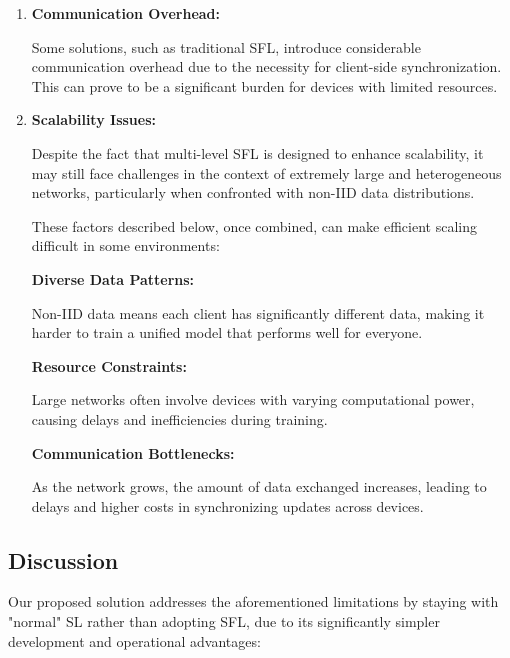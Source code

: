\begin{enumerate}
	\item \textbf{Communication Overhead:}
	
	Some solutions, such as traditional \gls{SFL}, introduce considerable communication overhead due to the necessity for client-side synchronization. This can prove to be a significant burden for devices with limited resources. 
	
	\item \textbf{Scalability Issues:}
	
	Despite the fact that multi-level \gls{SFL} is designed to enhance scalability, it may still face challenges in the context of extremely large and heterogeneous networks, particularly when confronted with non-IID data distributions.
	
	These factors described below, once combined, can make efficient scaling difficult in some environments:
	
	\subitem \textbf{Diverse Data Patterns:}
	
	 Non-IID data means each client has significantly different data, making it harder to train a unified model that performs well for everyone.
	 
	 \subitem \textbf{Resource Constraints:}
	 
	 Large networks often involve devices with varying computational power, causing delays and inefficiencies during training.
	 
	 \subitem \textbf{Communication Bottlenecks:}
	 
	 As the network grows, the amount of data exchanged increases, leading to delays and higher costs in synchronizing updates across devices.

\end{enumerate}


\subsection{Discussion}
\label{sec:sl_improvements_discussion}

Our proposed solution addresses the aforementioned limitations by staying with "normal" \gls{SL} rather than adopting \gls{SFL}, due to its significantly simpler development and operational advantages:

